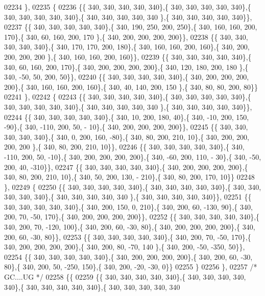 \begin{DoxyCode}
02234 \},
02235 \{
02236 \{\{ 340, 340, 340, 340, 340\},\{ 340, 340, 340, 340, 340\},\{ 340, 340, 340, 340, 340\},\{ 340, 340, 340, 340, 340
      \},\{ 340, 340, 340, 340, 340\}\},
02237 \{\{ 340, 340, 340, 340, 340\},\{ 340, 190, 250, 200, 250\},\{ 340, 160, 160, 200, 170\},\{ 340,  60, 160, 200, 170
      \},\{ 340, 200, 200, 200, 200\}\},
02238 \{\{ 340, 340, 340, 340, 340\},\{ 340, 170, 170, 200, 180\},\{ 340, 160, 160, 200, 160\},\{ 340, 200, 200, 200, 200
      \},\{ 340, 160, 160, 200, 160\}\},
02239 \{\{ 340, 340, 340, 340, 340\},\{ 340,  60, 160, 200, 170\},\{ 340, 200, 200, 200, 200\},\{ 340, 120, 180, 200, 180
      \},\{ 340, -50,  50, 200,  50\}\},
02240 \{\{ 340, 340, 340, 340, 340\},\{ 340, 200, 200, 200, 200\},\{ 340, 160, 160, 200, 160\},\{ 340,  40, 140, 200, 150
      \},\{ 340,  80,  80, 200,  80\}\}
02241 \},
02242 \{
02243 \{\{ 340, 340, 340, 340, 340\},\{ 340, 340, 340, 340, 340\},\{ 340, 340, 340, 340, 340\},\{ 340, 340, 340, 340, 340
      \},\{ 340, 340, 340, 340, 340\}\},
02244 \{\{ 340, 340, 340, 340, 340\},\{ 340,  10, 200, 180,  40\},\{ 340, -10, 200, 150, -90\},\{ 340, -110, 200,  50, -
      10\},\{ 340, 200, 200, 200, 200\}\},
02245 \{\{ 340, 340, 340, 340, 340\},\{ 340,   0, 200, 160, -80\},\{ 340,  80, 200, 210,  10\},\{ 340, 200, 200, 200, 200
      \},\{ 340,  80, 200, 210,  10\}\},
02246 \{\{ 340, 340, 340, 340, 340\},\{ 340, -110, 200,  50, -10\},\{ 340, 200, 200, 200, 200\},\{ 340, -60, 200, 110, -
      30\},\{ 340, -50, 200,  40, -310\}\},
02247 \{\{ 340, 340, 340, 340, 340\},\{ 340, 200, 200, 200, 200\},\{ 340,  80, 200, 210,  10\},\{ 340,  50, 200, 130, -
      210\},\{ 340,  80, 200, 170,  10\}\}
02248 \},
02249 \{
02250 \{\{ 340, 340, 340, 340, 340\},\{ 340, 340, 340, 340, 340\},\{ 340, 340, 340, 340, 340\},\{ 340, 340, 340, 340, 340
      \},\{ 340, 340, 340, 340, 340\}\},
02251 \{\{ 340, 340, 340, 340, 340\},\{ 340, 200, 150,   0, 210\},\{ 340, 200,  60, -130,  90\},\{ 340, 200,  70, -50, 
      170\},\{ 340, 200, 200, 200, 200\}\},
02252 \{\{ 340, 340, 340, 340, 340\},\{ 340, 200,  70, -120, 100\},\{ 340, 200,  60, -30,  80\},\{ 340, 200, 200, 200, 
      200\},\{ 340, 200,  60, -30,  80\}\},
02253 \{\{ 340, 340, 340, 340, 340\},\{ 340, 200,  70, -50, 170\},\{ 340, 200, 200, 200, 200\},\{ 340, 200,  80, -70, 140
      \},\{ 340, 200, -50, -350,  50\}\},
02254 \{\{ 340, 340, 340, 340, 340\},\{ 340, 200, 200, 200, 200\},\{ 340, 200,  60, -30,  80\},\{ 340, 200,  50, -250, 
      150\},\{ 340, 200, -20, -30,   0\}\}
02255 \}
02256 \},
02257 \textcolor{comment}{/* GC....UG */}
02258 \{\{
02259 \{\{ 340, 340, 340, 340, 340\},\{ 340, 340, 340, 340, 340\},\{ 340, 340, 340, 340, 340\},\{ 340, 340, 340, 340, 340

\end{DoxyCode}
